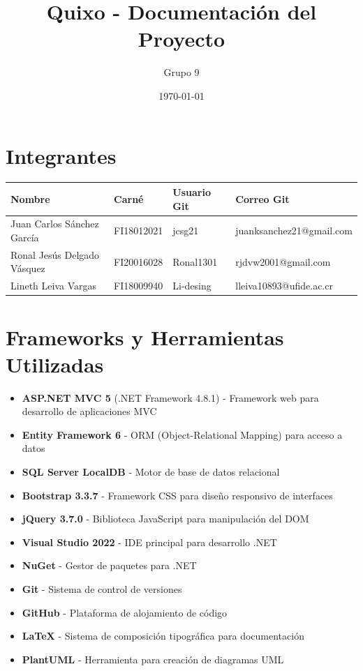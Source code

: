 \documentclass[12pt]{article}
\title{Quixo - Documentación del Proyecto}
\author{Grupo 9}
\date{\today}
\begin{document}
\maketitle

\section*{Integrantes}
\begin{longtable}{|l|l|l|l|}
\hline
\textbf{Nombre} & \textbf{Carné} & \textbf{Usuario Git} & \textbf{Correo Git} \\
\hline
Juan Carlos Sánchez García & FI18012021 & jcsg21 & juanksanchez21@gmail.com \\
Ronal Jesús Delgado Vásquez & FI20016028 & Ronal1301 & rjdvw2001@gmail.com \\
Lineth Leiva Vargas & FI18009940 & Li-desing & lleiva10893@ufide.ac.cr \\
\hline
\end{longtable}

\section*{Frameworks y Herramientas Utilizadas}
\begin{itemize}
    \item \textbf{ASP.NET MVC 5} (.NET Framework 4.8.1) - Framework web para desarrollo de aplicaciones MVC
    \item \textbf{Entity Framework 6} - ORM (Object-Relational Mapping) para acceso a datos
    \item \textbf{SQL Server LocalDB} - Motor de base de datos relacional
    \item \textbf{Bootstrap 3.3.7} - Framework CSS para diseño responsivo de interfaces
    \item \textbf{jQuery 3.7.0} - Biblioteca JavaScript para manipulación del DOM
    \item \textbf{Visual Studio 2022} - IDE principal para desarrollo .NET
    \item \textbf{NuGet} - Gestor de paquetes para .NET
    \item \textbf{Git} - Sistema de control de versiones
    \item \textbf{GitHub} - Plataforma de alojamiento de código
    \item \textbf{LaTeX} - Sistema de composición tipográfica para documentación
    \item \textbf{PlantUML} - Herramienta para creación de diagramas UML
\end{itemize}
\end{document}
